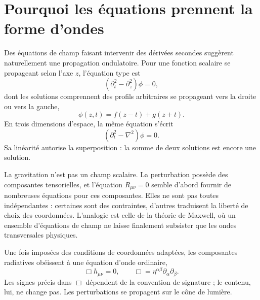 \begin{classroomqa}
\end{classroomqa}

\section{Pourquoi les équations prennent la forme d’ondes}

Des équations de champ faisant intervenir des dérivées secondes suggèrent naturellement une propagation ondulatoire. Pour une fonction scalaire se propageant selon l’axe \(z\), l’équation type est
\begin{equation}
 \left(\partial_t^2-\partial_z^2\right)\phi=0,
\end{equation}
dont les solutions comprennent des profils arbitraires se propageant vers la droite ou vers la gauche,
\begin{equation}
 \phi(z,t)=f(z-t)+g(z+t).
\end{equation}
En trois dimensions d’espace, la même équation s’écrit
\begin{equation}
 \left(\partial_t^2-\nabla^2\right)\phi=0.
\end{equation}
Sa linéarité autorise la superposition : la somme de deux solutions est encore une solution.

La gravitation n’est pas un champ scalaire. La perturbation possède des composantes tensorielles, et l’équation \(R_{\mu\nu}=0\) semble d’abord fournir de nombreuses équations pour ces composantes. Elles ne sont pas toutes indépendantes : certaines sont des contraintes, d’autres traduisent la liberté de choix des coordonnées. L’analogie est celle de la théorie de Maxwell, où un ensemble d’équations de champ ne laisse finalement subsister que les ondes transversales physiques.

Une fois imposées des conditions de coordonnées adaptées, les composantes radiatives obéissent à une équation d’onde ordinaire,
\begin{equation}
 \Box h_{\mu\nu}=0,
 \qquad
 \Box=\eta^{\alpha\beta}\partial_\alpha\partial_\beta.
 \label{eq:linear-wave}
\end{equation}
Les signes précis dans \(\Box\) dépendent de la convention de signature ; le contenu, lui, ne change pas. Les perturbations se propagent sur le cône de lumière.

